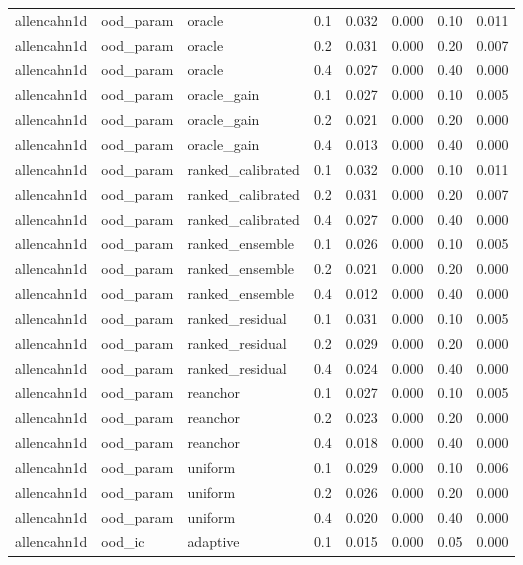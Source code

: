 \begin{longtable}{llllrrrr}
allencahn1d & ood\_param & oracle & 0.1 & 0.032 & 0.000 & 0.10 & 0.011 \\
allencahn1d & ood\_param & oracle & 0.2 & 0.031 & 0.000 & 0.20 & 0.007 \\
allencahn1d & ood\_param & oracle & 0.4 & 0.027 & 0.000 & 0.40 & 0.000 \\
allencahn1d & ood\_param & oracle\_gain & 0.1 & 0.027 & 0.000 & 0.10 & 0.005 \\
allencahn1d & ood\_param & oracle\_gain & 0.2 & 0.021 & 0.000 & 0.20 & 0.000 \\
allencahn1d & ood\_param & oracle\_gain & 0.4 & 0.013 & 0.000 & 0.40 & 0.000 \\
allencahn1d & ood\_param & ranked\_calibrated & 0.1 & 0.032 & 0.000 & 0.10 & 0.011 \\
allencahn1d & ood\_param & ranked\_calibrated & 0.2 & 0.031 & 0.000 & 0.20 & 0.007 \\
allencahn1d & ood\_param & ranked\_calibrated & 0.4 & 0.027 & 0.000 & 0.40 & 0.000 \\
allencahn1d & ood\_param & ranked\_ensemble & 0.1 & 0.026 & 0.000 & 0.10 & 0.005 \\
allencahn1d & ood\_param & ranked\_ensemble & 0.2 & 0.021 & 0.000 & 0.20 & 0.000 \\
allencahn1d & ood\_param & ranked\_ensemble & 0.4 & 0.012 & 0.000 & 0.40 & 0.000 \\
allencahn1d & ood\_param & ranked\_residual & 0.1 & 0.031 & 0.000 & 0.10 & 0.005 \\
allencahn1d & ood\_param & ranked\_residual & 0.2 & 0.029 & 0.000 & 0.20 & 0.000 \\
allencahn1d & ood\_param & ranked\_residual & 0.4 & 0.024 & 0.000 & 0.40 & 0.000 \\
allencahn1d & ood\_param & reanchor & 0.1 & 0.027 & 0.000 & 0.10 & 0.005 \\
allencahn1d & ood\_param & reanchor & 0.2 & 0.023 & 0.000 & 0.20 & 0.000 \\
allencahn1d & ood\_param & reanchor & 0.4 & 0.018 & 0.000 & 0.40 & 0.000 \\
allencahn1d & ood\_param & uniform & 0.1 & 0.029 & 0.000 & 0.10 & 0.006 \\
allencahn1d & ood\_param & uniform & 0.2 & 0.026 & 0.000 & 0.20 & 0.000 \\
allencahn1d & ood\_param & uniform & 0.4 & 0.020 & 0.000 & 0.40 & 0.000 \\
\midrule
allencahn1d & ood\_ic & adaptive & 0.1 & 0.015 & 0.000 & 0.05 & 0.000 \\

\end{longtable}
